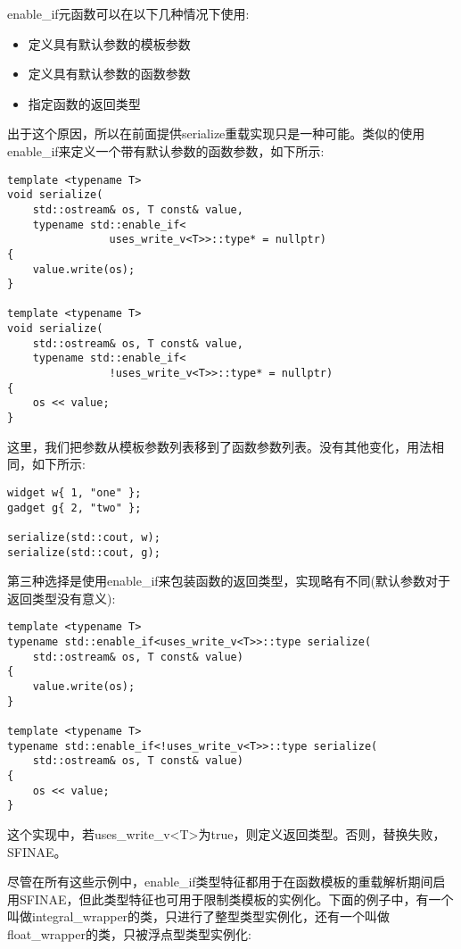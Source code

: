 enable\_if元函数可以在以下几种情况下使用:

\begin{itemize}
\item
定义具有默认参数的模板参数

\item
定义具有默认参数的函数参数

\item
指定函数的返回类型
\end{itemize}

出于这个原因，所以在前面提供serialize重载实现只是一种可能。类似的使用enable\_if来定义一个带有默认参数的函数参数，如下所示:

\begin{lstlisting}[style=styleCXX]
template <typename T>
void serialize(
	std::ostream& os, T const& value,
	typename std::enable_if<
				uses_write_v<T>>::type* = nullptr)
{
	value.write(os);
}

template <typename T>
void serialize(
	std::ostream& os, T const& value,
	typename std::enable_if<
				!uses_write_v<T>>::type* = nullptr)
{
	os << value;
}
\end{lstlisting}

这里，我们把参数从模板参数列表移到了函数参数列表。没有其他变化，用法相同，如下所示:

\begin{lstlisting}[style=styleCXX]
widget w{ 1, "one" };
gadget g{ 2, "two" };

serialize(std::cout, w);
serialize(std::cout, g);
\end{lstlisting}

第三种选择是使用enable\_if来包装函数的返回类型，实现略有不同(默认参数对于返回类型没有意义):

\begin{lstlisting}[style=styleCXX]
template <typename T>
typename std::enable_if<uses_write_v<T>>::type serialize(
	std::ostream& os, T const& value)
{
	value.write(os);
}

template <typename T>
typename std::enable_if<!uses_write_v<T>>::type serialize(
	std::ostream& os, T const& value)
{
	os << value;
}
\end{lstlisting}

这个实现中，若uses\_write\_v<T>为true，则定义返回类型。否则，替换失败，SFINAE。

尽管在所有这些示例中，enable\_if类型特征都用于在函数模板的重载解析期间启用SFINAE，但此类型特征也可用于限制类模板的实例化。下面的例子中，有一个叫做integral\_wrapper的类，只进行了整型类型实例化，还有一个叫做float\_wrapper的类，只被浮点型类型实例化:

